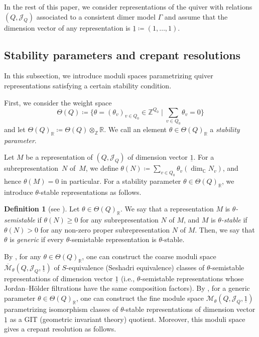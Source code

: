 \documentclass[10pt,a4paper]{amsart}
\numberwithin{equation}{section}
\theoremstyle{definition}
\newtheorem{Definition}[Theorem]{Definition}
\newcommand{\ZZ}{\mathbb{Z}}
\newcommand{\RR}{\mathbb{R}}
\newcommand{\CC}{\mathbb{C}}
\newcommand{\calJ}{\mathcal{J}}
\newcommand{\calM}{\mathcal{M}}
\newcommand{\barone}{\underline{1}}
\begin{document}
In the rest of this paper, we consider representations of the quiver with relations $(Q,\calJ_Q)$ associated to a consistent dimer model $\Gamma$
and assume that the dimension vector of any representation is $\barone\coloneqq(1,\dots,1)$.

\subsection{Stability parameters and crepant resolutions}\label{subsec_crepant_resolution}

In this subsection, we introduce moduli spaces parametrizing quiver representations satisfying a certain stability condition.

First, we consider the weight space
\[
\Theta(Q)\coloneqq\biggl\{\theta=(\theta_v)_{v\in Q_0}\in\ZZ^{Q_0} \mid \sum_{v\in Q_0}\theta_v=0\biggr\}
\]
and let $\Theta(Q)_\RR\coloneqq\Theta(Q)\otimes_\ZZ\RR$.
We call an element $\theta\in\Theta(Q)_\RR$ a \emph{stability parameter}.

Let $M$ be a representation of $(Q,\calJ_Q)$ of dimension vector $\barone$.
For a subrepresentation~$N$ of~$M$, we define $\theta(N)\coloneqq\sum_{v\in Q_0}\theta_v(\dim_\CC N_v)$, and hence $\theta(M)=0$ in particular.
For a stability parameter $\theta\in\Theta(Q)_\RR$, we introduce $\theta$-stable representations as follows.

\begin{Definition}[{see \cite{King_moduli}}]
Let $\theta\in\Theta(Q)_\RR$.
We say that a representation $M$ is \emph{$\theta$-semistable} if $\theta(N)\ge0$ for any subrepresentation $N$ of $M$, and
$M$ is \emph{$\theta$-stable} if $\theta(N)>0$ for any non-zero proper subrepresentation $N$ of $M$.
Then, we say that $\theta$ is \emph{generic} if every $\theta$-semistable representation is $\theta$-stable.
\end{Definition}

By \cite[Proposition~5.2]{King_moduli}, for any $\theta\in\Theta(Q)_\RR$, one can construct the coarse moduli space $\overline{\calM}_\theta(Q,\calJ_Q, \barone)$ of $S$-equivalence (Seshadri equivalence) classes of $\theta$-semistable representations of dimension vector $\barone$
(i.e., $\theta$-semistable representations whose Jordan--H\"{o}lder filtrations have the same composition factors).
By \cite[Proposition~5.3]{King_moduli}, for a generic parameter $\theta\in\Theta(Q)_\RR$,
one can construct the fine module space $\calM_\theta(Q,\calJ_Q, \barone)$ parametrizing isomorphism classes of $\theta$-stable representations of dimension vector $\barone$ as a GIT (geometric invariant theory) quotient.
Moreover, this moduli space gives a crepant resolution as follows.
\end{document}
